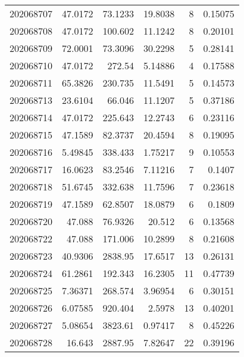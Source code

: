 \begin{tabular}{rrrrrr}
 202068707 &         47.0172  &       73.1233 &           19.8038  &           8 & 0.15075 \\
 202068708 &         47.0172  &      100.602  &           11.1242  &           8 & 0.20101 \\
 202068709 &         72.0001  &       73.3096 &           30.2298  &           5 & 0.28141 \\
 202068710 &         47.0172  &      272.54   &            5.14886 &           4 & 0.17588 \\
 202068711 &         65.3826  &      230.735  &           11.5491  &           5 & 0.14573 \\
 202068713 &         23.6104  &       66.046  &           11.1207  &           5 & 0.37186 \\
 202068714 &         47.0172  &      225.643  &           12.2743  &           6 & 0.23116 \\
 202068715 &         47.1589  &       82.3737 &           20.4594  &           8 & 0.19095 \\
 202068716 &          5.49845 &      338.433  &            1.75217 &           9 & 0.10553 \\
 202068717 &         16.0623  &       83.2546 &            7.11216 &           7 & 0.1407  \\
 202068718 &         51.6745  &      332.638  &           11.7596  &           7 & 0.23618 \\
 202068719 &         47.1589  &       62.8507 &           18.0879  &           6 & 0.1809  \\
 202068720 &         47.088   &       76.9326 &           20.512   &           6 & 0.13568 \\
 202068722 &         47.088   &      171.006  &           10.2899  &           8 & 0.21608 \\
 202068723 &         40.9306  &     2838.95   &           17.6517  &          13 & 0.26131 \\
 202068724 &         61.2861  &      192.343  &           16.2305  &          11 & 0.47739 \\
 202068725 &          7.36371 &      268.574  &            3.96954 &           6 & 0.30151 \\
 202068726 &          6.07585 &      920.404  &            2.5978  &          13 & 0.40201 \\
 202068727 &          5.08654 &     3823.61   &            0.97417 &           8 & 0.45226 \\
 202068728 &         16.643   &     2887.95   &            7.82647 &          22 & 0.39196 \\

\end{tabular}
